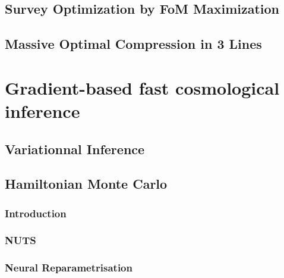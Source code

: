 \documentclass[final,5p,times,twocolumn,authoryear]{elsarticle}
\begin{document}


\subsection{Survey Optimization by FoM Maximization}

\subsection{Massive Optimal Compression in 3 Lines}


\section{Gradient-based fast cosmological inference}


\subsection{Variationnal Inference}


\subsection{Hamiltonian Monte Carlo}

\subsubsection{Introduction}


\subsubsection{NUTS}


\subsubsection{Neural Reparametrisation}
\end{document}
